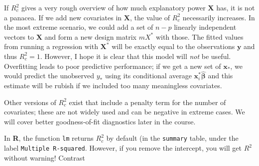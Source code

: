 \documentclass[]{book}
\newenvironment{Shaded}{\begin{snugshade}}{\end{snugshade}}
\newcommand{\CommentTok}[1]{\textcolor[rgb]{0.56,0.35,0.01}{\textit{#1}}}
\newcommand{\DataTypeTok}[1]{\textcolor[rgb]{0.13,0.29,0.53}{#1}}
\newcommand{\DecValTok}[1]{\textcolor[rgb]{0.00,0.00,0.81}{#1}}
\newcommand{\KeywordTok}[1]{\textcolor[rgb]{0.13,0.29,0.53}{\textbf{#1}}}
\newcommand{\NormalTok}[1]{#1}
\newcommand{\OperatorTok}[1]{\textcolor[rgb]{0.81,0.36,0.00}{\textbf{#1}}}
\newcommand{\StringTok}[1]{\textcolor[rgb]{0.31,0.60,0.02}{#1}}
\theoremstyle{definition}
\theoremstyle{definition}
\theoremstyle{definition}
\theoremstyle{remark}
\let\BeginKnitrBlock\begin \let\EndKnitrBlock\end
\begin{document}
If \(R^2_c\) gives a very rough overview of how much explanatory power \(\mathbf{X}\) has, it is not a panacea. If we add new covariates in \(\mathbf{X}\), the value of \(R^2_c\) necessarily increases. In the most extreme scenario, we could add a set of \(n-p\) linearly independent vectors to \(\mathbf{X}\) and form a new design matrix \(mX^*\) with those. The fitted values from running a regression with \(\mathbf{X}^*\) will be exactly equal to the observations \(\boldsymbol{y}\) and thus \(R^2_c=1\). However, I hope it is clear that this model will \emph{not} be useful. Overfitting leads to poor predictive performance; if we get a new set of \(\mathbf{x}_*\), we would predict the unobserved \(y_*\) using its conditional average \(\mathbf{x}_i^*\hat{\boldsymbol{\beta}}\) and this estimate will be rubish if we included too many meaningless covariates.

Other versions of \(R^2_c\) exist that include a penalty term for the number of covariates; these are not widely used and can be negative in extreme cases. We will cover better goodness-of-fit diagnostics later in the course.

\BeginKnitrBlock{rmdcaution}
In \textbf{R}, the function \texttt{lm} returns \(R^2_c\) by default (in the \texttt{summary} table, under the label \texttt{Multiple\ R-squared}. However, if you remove the intercept, you will get \(R^2\) without warning!
Contrast
\EndKnitrBlock{rmdcaution}

\begin{Shaded}
\end{Shaded}
\end{document}
